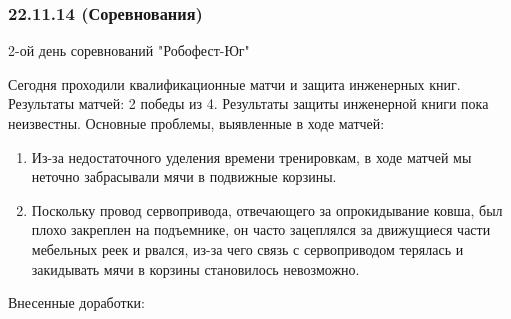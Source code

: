 \subsubsection{22.11.14 (Соревнования)}
\begin{center}
	2-ой день соревнований "Робофест-Юг"
\end{center}
Сегодня проходили квалификационные матчи и защита инженерных книг.
\newline 
Результаты матчей: 2 победы из 4. 
\newline
Результаты защиты инженерной книги пока неизвестны.
\newline
Основные проблемы, выявленные в ходе матчей:
\begin{enumerate}
	\item Из-за недостаточного уделения времени тренировкам, в ходе матчей мы неточно забрасывали мячи в подвижные корзины. 
	
	\item Поскольку провод сервопривода, отвечающего за опрокидывание ковша, был плохо закреплен на подъемнике, он часто зацеплялся за движущиеся части мебельных реек и рвался, из-за чего связь с сервоприводом терялась и закидывать мячи в корзины становилось невозможно.
	
\end{enumerate} 
Внесенные  доработки:
